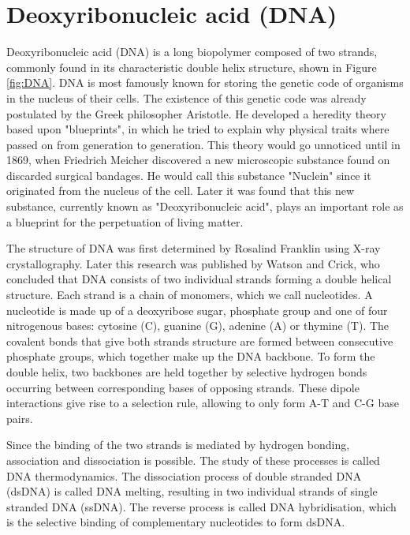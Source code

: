 \section{Deoxyribonucleic acid (DNA)}


Deoxyribonucleic acid (DNA) is a long biopolymer composed of two strands, commonly found
in its characteristic double helix structure, shown in Figure \ref{fig:DNA}. DNA is most
famously known for storing the
genetic code of organisms in the nucleus of their cells. The existence of this genetic
code was already
postulated by the Greek philosopher Aristotle. He developed a heredity theory based
upon "blueprints", in which he tried to explain why physical traits where passed on from
generation to generation. This theory would go unnoticed until in 1869, when
Friedrich Meicher discovered a new microscopic substance found on discarded
surgical bandages.\cite{Miescher1871} He would call this substance "Nuclein" since it
originated from the nucleus of the cell. Later it was found that this new substance,
currently known as "Deoxyribonucleic acid", plays an important role as a blueprint for
the perpetuation of living matter.\cite{Avery1944}

The structure of DNA was first determined by Rosalind Franklin using X-ray
crystallography. Later this research was published by Watson and Crick, who concluded
that DNA consists of two individual strands forming a double helical
structure.\cite{WATSON1953} Each strand is a chain of monomers, which we call
nucleotides. A nucleotide is made up of a
deoxyribose sugar, phosphate group and one of four nitrogenous bases: cytosine (C),
guanine (G), adenine (A) or thymine (T). The covalent bonds that give both strands
structure
are formed between consecutive phosphate groups, which together make up the DNA backbone.
To form the double helix, two backbones are held together by
selective hydrogen bonds occurring between corresponding bases of opposing strands. These
dipole interactions give rise to a selection rule, allowing to only form A-T and C-G base
pairs.

Since the binding of the two strands is mediated by hydrogen bonding, association and
dissociation is possible. The study of these processes is called DNA thermodynamics. The
dissociation process of double stranded DNA (dsDNA) is called DNA melting, resulting in
two individual strands of single stranded DNA (ssDNA). The reverse process is called DNA
hybridisation, which is the selective binding of complementary nucleotides to form dsDNA.

